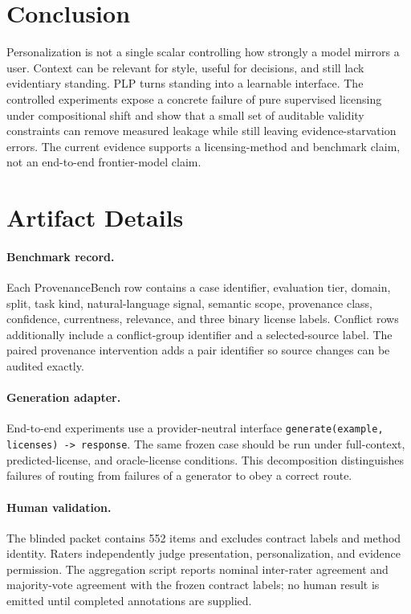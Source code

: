 \documentclass[10pt,twocolumn]{article}
\begin{document}
\section{Conclusion}
Personalization is not a single scalar controlling how strongly a model mirrors a user. Context can be relevant for style, useful for decisions, and still lack evidentiary standing. PLP turns standing into a learnable interface. The controlled experiments expose a concrete failure of pure supervised licensing under compositional shift and show that a small set of auditable validity constraints can remove measured leakage while still leaving evidence-starvation errors. The current evidence supports a licensing-method and benchmark claim, not an end-to-end frontier-model claim.

\appendix
\section{Artifact Details}
\paragraph{Benchmark record.} Each ProvenanceBench row contains a case identifier, evaluation tier, domain, split, task kind, natural-language signal, semantic scope, provenance class, confidence, currentness, relevance, and three binary license labels. Conflict rows additionally include a conflict-group identifier and a selected-source label. The paired provenance intervention adds a pair identifier so source changes can be audited exactly.

\paragraph{Generation adapter.} End-to-end experiments use a provider-neutral interface \texttt{generate(example, licenses) -> response}. The same frozen case should be run under full-context, predicted-license, and oracle-license conditions. This decomposition distinguishes failures of routing from failures of a generator to obey a correct route.

\paragraph{Human validation.} The blinded packet contains 552 items and excludes contract labels and method identity. Raters independently judge presentation, personalization, and evidence permission. The aggregation script reports nominal inter-rater agreement and majority-vote agreement with the frozen contract labels; no human result is emitted until completed annotations are supplied.
\end{document}
